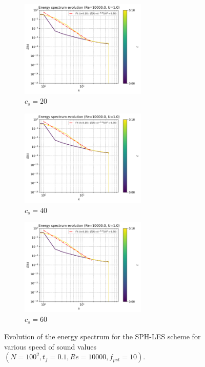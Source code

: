 \begin{figure}[H]
  \begin{subfigure}{7cm}
    \centering\includegraphics[width=6cm]{Code-Figures/okra2022/c0/c0_20_tait_pec_dtmul_1_nx_100_pst_10_re_10000_ok2022/energy_spectrum_evolution.png}
    \caption{$c_s=20$}
  \end{subfigure}
  \begin{subfigure}{7cm}
    \centering\includegraphics[width=6cm]{Code-Figures/okra2022/c0/c0_40_tait_pec_dtmul_1_nx_100_pst_10_re_10000_ok2022/energy_spectrum_evolution.png}
    \caption{$c_s=40$}
  \end{subfigure}
  \begin{subfigure}{7cm}
    \centering\includegraphics[width=6cm]{Code-Figures/okra2022/c0/c0_60_tait_pec_dtmul_1_nx_100_pst_10_re_10000_ok2022/energy_spectrum_evolution.png}
    \caption{$c_s=60$}
  \end{subfigure}
  \caption{Evolution of the energy spectrum for the SPH-LES scheme for various speed of sound values $(N=100^2, t_f=0.1, Re=10000, f_{pst}=10)$.}
  \label{fig:okra2022-c0-espec}
\end{figure}

